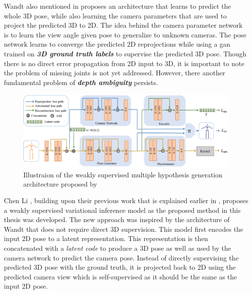 Wandt \etal \cite{repnet} also mentioned in  proposes an architecture that learns to predict the whole 3D pose, while also learning the camera parameters that are used to project the predicted 3D to 2D. The idea behind the camera parameter network is to learn the view angle given pose to generalize to unknown cameras. The pose network learns to converge the predicted 2D reprojections while using a \ac{gan} trained on \textit{\textbf{3D ground truth labels}} to supervise the predicted 3D pose. Though there is no direct error propagation from 2D input to 3D, it is important to note the problem of missing joints is not yet addressed. However, there another fundamental problem of \textit{\textbf{depth ambiguity}} persists. 

\begin{figure}[h] 
    \centering
    \includegraphics[width=\linewidth]{figures/background/multi_arch.pdf}
    \caption{Illustraion of the weakly supervised multiple hypothesis generation architecture proposed by \cite{weaklymultiple}}
    \label{fig:multi_arch}
\end{figure}


Chen Li \etal \cite{weaklymultiple}, building upon their previous work \cite{multiplehypo} that is explained earlier in , proposes a weakly supervised variational inference model as the proposed method in this thesis was developed. The new approach \cite{weaklymultiple} was inspired by the architecture of Wandt \etal \cite{repnet} that does not require direct 3D supervision. This model first encodes the input 2D pose to a latent representation. This representation is then concatenated with a \textit{latent code} to produce a 3D pose as well as used by the camera network to predict the camera pose. Instead of directly supervising the predicted 3D pose with the ground truth, it is projected back to 2D using the predicted camera view which is self-supervised as it should be the same as the input 2D pose. 

